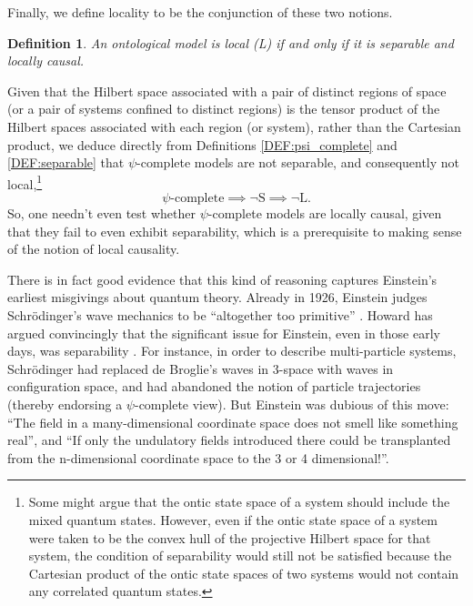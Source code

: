 \documentclass[aps,nofootinbib,12pt]{revtex4-2}
\newtheorem{definition}[theorem]{Definition}
\begin{document}
Finally, we define locality to be the conjunction of these two
notions.
\begin{definition}
An ontological model is \emph{local} (L) if and only if it is
separable and locally causal. \label{DEF:bell_local}
\end{definition}

Given that the Hilbert space associated with a pair of distinct
regions of space (or a pair of systems confined to distinct regions)
is the tensor product of the Hilbert spaces associated with each
region (or system), rather than the Cartesian product, we deduce
directly from Definitions \ref{DEF:psi_complete} and
\ref{DEF:separable} that $\psi$-complete models are not separable,
and consequently not local,\footnote{Some might argue that the ontic
state space of a system should include the mixed quantum states.
However, even if the ontic state space of a system were taken to be
the convex hull of the projective Hilbert space for that system, the
condition of separability would still not be satisfied because the
Cartesian product of the ontic state spaces of two systems would not
contain any correlated quantum states.}
\begin{equation}
\psi\text{-complete}\implies\lnot\text{S}\implies\lnot\text{L}.
\end{equation}
So, one needn't even test whether $\psi$-complete models are locally
causal, given that they fail to even exhibit separability, which is
a prerequisite to making sense of the notion of local causality.

There is in fact good evidence that this kind of reasoning captures
Einstein's earliest misgivings about quantum theory. Already in
1926, Einstein judges Schr\"{o}dinger's wave mechanics to be
``altogether too primitive'' \cite{Einstein_ehrenfest}. Howard has
argued convincingly that the significant issue for Einstein, even in
those early days, was separability \cite{Howard_einst_long}. For
instance, in order to describe multi-particle systems,
Schr\"{o}dinger had replaced de Broglie's waves in 3-space with
waves in configuration space, and had abandoned the notion of
particle trajectories (thereby endorsing a $\psi$-complete view).
But Einstein was dubious of this move: ``The field in a
many-dimensional coordinate space does not smell like something
real''\cite{Einstein_ehrenfest2}, and ``If only the undulatory
fields introduced there could be transplanted from the n-dimensional
coordinate space to the 3 or 4
dimensional!''\cite{Einstein_sommerfield}.
\end{document}

